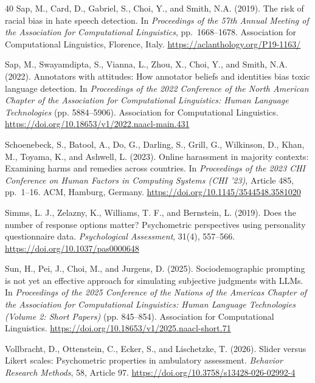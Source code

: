 \documentclass[a4paper,fleqn,review]{cas-sc}
\begin{document}
\begin{thebibliography}{40}
Sap, M., Card, D., Gabriel, S., Choi, Y., and Smith, N.A. (2019).
The risk of racial bias in hate speech detection.
In \emph{Proceedings of the 57th Annual Meeting of the Association for Computational Linguistics}, pp.~1668--1678. Association for Computational Linguistics, Florence, Italy.
\url{https://aclanthology.org/P19-1163/}

Sap, M., Swayamdipta, S., Vianna, L., Zhou, X., Choi, Y., and Smith, N.A. (2022).
Annotators with attitudes: How annotator beliefs and identities bias toxic language detection.
In \emph{Proceedings of the 2022 Conference of the North American Chapter of the Association for Computational Linguistics: Human Language Technologies} (pp. 5884--5906).
Association for Computational Linguistics.
\url{https://doi.org/10.18653/v1/2022.naacl-main.431}

Schoenebeck, S., Batool, A., Do, G., Darling, S., Grill, G., Wilkinson, D., Khan, M., Toyama, K., and Ashwell, L. (2023).
Online harassment in majority contexts: Examining harms and remedies across countries.
In \emph{Proceedings of the 2023 CHI Conference on Human Factors in Computing Systems (CHI '23)}, Article 485, pp.~1--16. ACM, Hamburg, Germany.
\url{https://doi.org/10.1145/3544548.3581020}

Simms, L. J., Zelazny, K., Williams, T. F., and Bernstein, L. (2019).
Does the number of response options matter? Psychometric perspectives using personality questionnaire data.
\emph{Psychological Assessment}, 31(4), 557--566.
\url{https://doi.org/10.1037/pas0000648}

Sun, H., Pei, J., Choi, M., and Jurgens, D. (2025).
Sociodemographic prompting is not yet an effective approach for simulating subjective judgments with LLMs.
In \emph{Proceedings of the 2025 Conference of the Nations of the Americas Chapter of the Association for Computational Linguistics: Human Language Technologies (Volume 2: Short Papers)} (pp. 845--854).
Association for Computational Linguistics.
\url{https://doi.org/10.18653/v1/2025.naacl-short.71}

Vollbracht, D., Ottenstein, C., Ecker, S., and Lischetzke, T. (2026).
Slider versus Likert scales: Psychometric properties in ambulatory assessment.
\emph{Behavior Research Methods}, 58, Article 97.
\url{https://doi.org/10.3758/s13428-026-02992-4}


\end{thebibliography}
\end{document}
